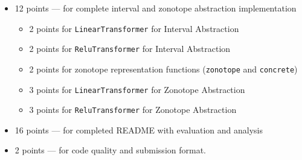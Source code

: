 \begin{itemize}
\item 12 points — for complete interval and zonotope abstraction implementation
    \begin{itemize}
    \item 2 points for \texttt{LinearTransformer} for Interval Abstraction
    \item 2 points for \texttt{ReluTransformer} for Interval Abstraction
    \item 2 points for zonotope representation functions (\texttt{zonotope} and \texttt{concrete})
    \item 3 points for \texttt{LinearTransformer} for Zonotope Abstraction
    \item 3 points for \texttt{ReluTransformer} for Zonotope Abstraction
    \end{itemize}
\item 16 points — for completed README with evaluation and analysis
\item 2 points — for code quality and submission format.
\end{itemize}